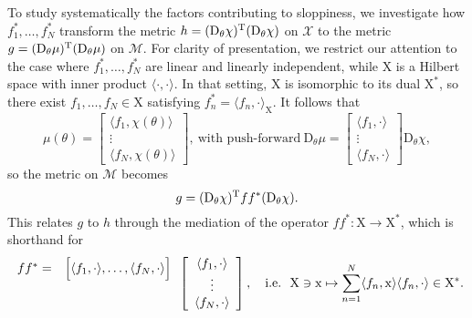 \documentclass{article}
\newcommand{\D}{\mathrm{D}}
\newcommand{\norm}[1]{\vert\vert#1\vert\vert}
\newcommand{\p}{\theta}
\newcommand{\fmr}{\chi}
\newcommand{\fmm}{\mathcal{X}}
\newcommand{\omr}{\mu}
\newcommand{\omm}{\mathcal{M}}
\newcommand{\fms}{\mathrm{X}}
\newcommand{\be}{\begin{equation}}
\newcommand{\ee}{\end{equation}}
\begin{document}
To study systematically the factors contributing to sloppiness, we investigate how
$f^*_1,\ldots,f^*_N$ transform the metric $h = (\D_\p\fmr)^{\rm T}(\D_\p\fmr)$ on $\fmm$ to the metric $g = (\D_\p\omr)^{\rm T}(\D_\p\omr)$ on $\omm$.
For clarity of presentation, we restrict our attention to the case where
$f^*_1,\ldots,f^*_N$ are linear and linearly independent, while $\fms$ is a Hilbert space with inner product $\langle\cdot,\cdot\rangle$.
In that setting, $\fms$ is isomorphic to its dual $\fms^*$, so there exist $f_1,\ldots,f_N \in \fms$ satisfying $f^*_n = \langle f_n,\cdot \rangle_\fms$.
It follows that
%
\[
 \omr(\p)
=
\left[\begin{array}{c}
 \langle f_1,\fmr(\p) \rangle
\\
\vdots
\\
 \langle f_N,\fmr(\p) \rangle
\end{array}\right] ,
\ \mbox{with push-forward} \
 \D_\p\omr%
=
\left[\begin{array}{c}
 \langle f_1,\cdot\rangle
\\
\vdots
\\
 \langle f_N,\cdot \rangle
\end{array}\right]
 \D_\p\fmr,%
\]
%
so the metric on $\omm$ becomes
%
\be
 g
=
 (\D_\p\fmr)^{\rm T} f f^* (\D_\p\fmr) . %
\label{g-vs-Dpx}
\ee
%
This relates $g$ to $h$ through the mediation of the operator $f f^* : \fms \to \fms^*$, which is shorthand for
%
\[
\begin{array}{c}
 f f^*
=
\\
\vspace*{4mm}
\end{array}
\begin{array}{c}
\Big[
 \langle f_1,\cdot\rangle
,
 \ldots
,
 \langle f_N,\cdot\rangle
\Big]
\\
\vspace*{4mm}
\end{array}
%
\left[\begin{array}{c}
 \langle f_1,\cdot\rangle
\\
 \vdots
\\
 \langle f_N,\cdot\rangle
\end{array}\right] ,
\quad\mbox{i.e.}\ \
 \fms \ni \mathrm{x} \mapsto \sum_{n=1}^N
 \langle f_n , \mathrm{x}\rangle
 \langle f_n , \cdot \rangle \in \fms^* .
\]
%
\end{document}
